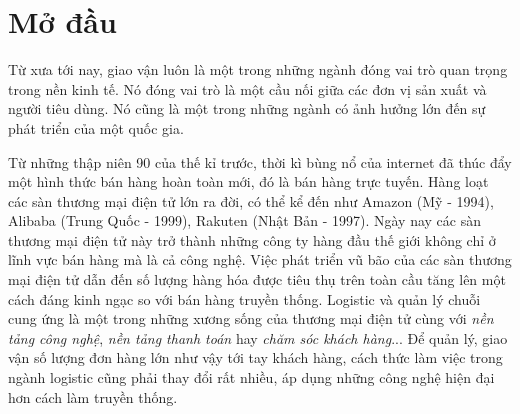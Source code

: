 \chapter{Mở đầu}
Từ xưa tới nay, giao vận luôn là một trong những ngành đóng vai trò quan trọng trong nền kinh tế. Nó đóng vai trò là một cầu nối giữa các đơn vị sản xuất và người tiêu dùng. Nó cũng là một trong những ngành có ảnh hưởng lớn đến sự phát triển của một quốc gia. 

Từ những thập niên 90 của thế kỉ trước, thời kì bùng nổ của internet đã thúc đẩy một hình thức bán hàng hoàn toàn mới, đó là bán hàng trực tuyến. Hàng loạt các sàn thương mại điện tử lớn ra đời, có thể kể đến như Amazon (Mỹ - 1994), Alibaba (Trung Quốc - 1999), Rakuten (Nhật Bản - 1997). Ngày nay các sàn thương mại điện tử này trở thành những công ty hàng đầu thế giới không chỉ ở lĩnh vực bán hàng mà là cả công nghệ. Việc phát triển vũ bão của các sàn thương mại điện tử dẫn đến số lượng hàng hóa được tiêu thụ trên toàn cầu tăng lên một cách đáng kinh ngạc so với bán hàng truyền thống. Logistic và quản lý chuỗi cung ứng là một trong những xương sống của thương mại điện tử cùng với \textit{nền tảng công nghệ}, \textit{nền tảng thanh toán} hay \textit{chăm sóc khách hàng}... Để quản lý, giao vận số lượng đơn hàng lớn như vậy tới tay khách hàng, cách thức làm việc trong ngành logistic cũng phải thay đổi rất nhiều, áp dụng những công nghệ hiện đại hơn cách làm truyền thống.

